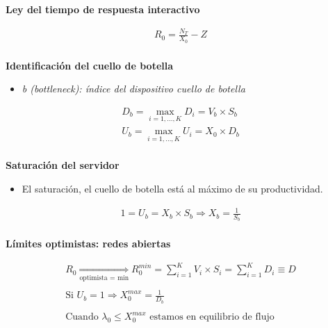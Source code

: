 \documentclass[a4paper,12pt]{article}
\begin{document}
\textbf{Ley del tiempo de respuesta interactivo}

\begin{tcolorbox}[colback=yellow!5!white, colframe=yellow!75!black]
    \begin{align*}
        R_0 = \frac{N_T}{X_0} - Z \\
    \end{align*}
\end{tcolorbox}

\textbf{Identificación del cuello de botella}

\begin{itemize}
    \item \textit{b (bottleneck): índice del dispositivo cuello de botella}
\end{itemize}

\begin{tcolorbox}[colback=yellow!5!white, colframe=yellow!75!black]
    \begin{align*}
        D_b = \max_{i=1, \ldots, K} D_i = V_b \times S_b \\ 
        U_b = \max_{i=1, \ldots, K} U_i = X_0 \times D_b \\
    \end{align*}
\end{tcolorbox}

\textbf{Saturación del servidor}

\begin{itemize}
    \item El saturación, el cuello de botella está al máximo de su productividad.
\end{itemize}

\begin{tcolorbox}[colback=yellow!5!white, colframe=yellow!75!black]
    \begin{align*}
        1 = U_b = X_b \times S_b \Rightarrow X_b = \frac{1}{S_b} \\
    \end{align*}
\end{tcolorbox}

\textbf{Límites optimistas: redes abiertas}

\begin{tcolorbox}[colback=yellow!5!white, colframe=yellow!75!black]
    \begin{align*}
        R_0 \underset{\text{optimista = min}}{\Rightarrow} R_0^{min} = \sum_{i=1}^{K} V_i \times S_i = \sum_{i=1}^{K} D_i \equiv D \\ \\
        \text{Si } U_b = 1 \Rightarrow X_0^{max} = \frac{1}{D_b} \\ \\
        \text{Cuando } \lambda_0 \leq X_0^{max} \text{ estamos en equilibrio de flujo }\\
    \end{align*}
\end{tcolorbox}
\end{document}
